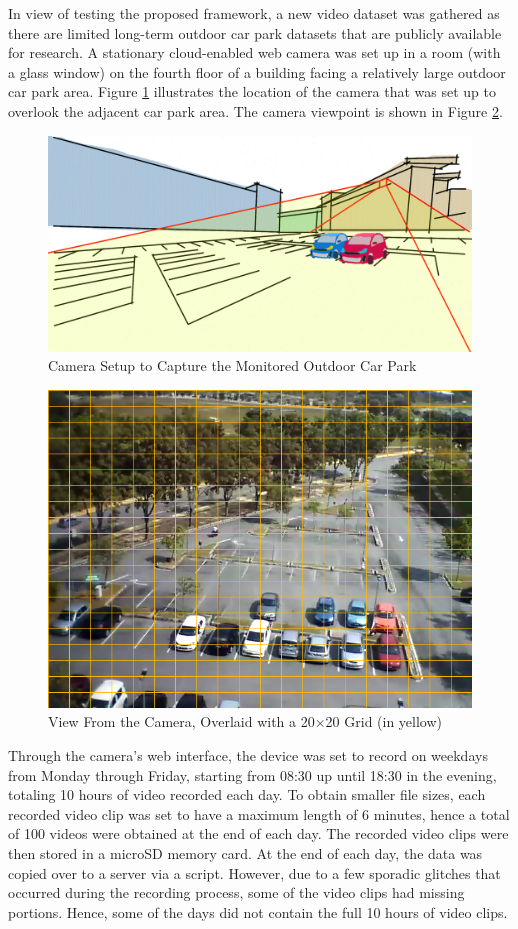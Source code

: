 In view of testing the proposed framework, a new video dataset was gathered as there are limited long-term outdoor car park datasets that are publicly available for research. A stationary cloud-enabled web camera was set up in a room (with a glass window) on the fourth floor of a building facing a relatively large outdoor car park area. Figure \ref{fig:camerasetup} illustrates the location of the camera that was set up to overlook the adjacent car park area. The camera viewpoint is shown in Figure \ref{fig:viewfromcamera}.
\begin{figure}[hbt!]\centering
\includegraphics[width=.8\textwidth]{image/new/fcicarpark2.png}
\caption{Camera Setup to Capture the Monitored Outdoor Car Park}
\label{fig:camerasetup}
\end{figure}
\begin{figure}[!hbt]\centering
\includegraphics[width=.7\textwidth]{image/general/grids.png}
\caption{View From the Camera, Overlaid with a 20$\times$20 Grid (in yellow)}
\label{fig:viewfromcamera}
\end{figure}

Through the camera's web interface, the device was set to record on weekdays from Monday through Friday, starting from 08:30 up until 18:30 in the evening, totaling 10 hours of video recorded each day. To obtain smaller file sizes, each recorded video clip was set to have a maximum length of 6 minutes, hence a total of 100 videos were obtained at the end of each day. The recorded video clips were then stored in a microSD memory card.
At the end of each day, the data was copied over to a server via a script. However, due to a few sporadic glitches that occurred during the recording process, some of the video clips had missing portions. Hence, some of the days did not contain the full 10 hours of video clips.

